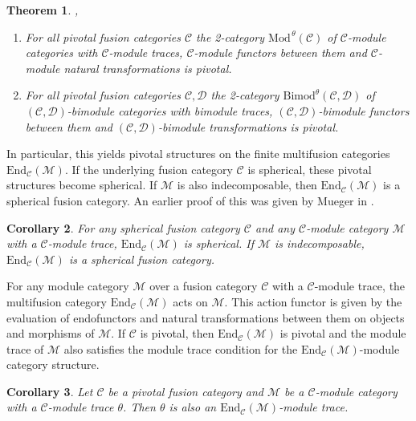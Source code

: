\documentclass[1.5pt, a4paper]{article}
\newcommand{\mac}{\mathcal C}
\newcommand{\mad}{\mathcal D}
\newcommand{\mam}{\mathcal M}
\newcommand{\End}{\mathrm{End}}
\newcommand{\Bimod}{\mathrm{Bimod}}
\newtheorem{theorem}{Theorem}[section]
\newtheorem{corollary}[theorem]{Corollary}
\begin{document}
\begin{theorem}\label{th:pivot}\cite[Th.~4.5]{G12}, \cite[Th.~5.8]{G14} 
\begin{enumerate}
\item For all pivotal fusion categories $\mac$ the 2-category $\text{Mod}^{\,\theta}(\mac)$ of $\mac$-module categories with $\mac$-module traces, $\mac$-module functors between them  and $\mac$-module natural transformations is pivotal.

\item For all  pivotal fusion categories $\mac,\mad$ the 2-category  $\Bimod^\theta(\mac,\mad)$ of  $(\mac,\mad)$-bimodule categories with bimodule traces, $(\mac,\mad)$-bimodule functors between them and $(\mac,\mad)$-bimodule transformations is pivotal. 
\end{enumerate}
\end{theorem}

In particular, this yields  pivotal structures  on the finite multifusion  categories  $\End_\mac(\mam)$. If the underlying fusion category $\mac$ is spherical, these pivotal structures become spherical.  If $\mam$ is also indecomposable, then  $\End_\mac(\mam)$ is a spherical fusion category. An earlier proof of this was given by Mueger in \cite[Th.~5.16]{Mue}.

\begin{corollary} \label{cor:endmpiv} \cite[Prop.~5.10]{G12}  For any spherical fusion category $\mac$ and any  $\mac$-module category $\mam$ with a $\mac$-module trace,
$\End_\mac(\mam)$ is  spherical. If $\mam$ is indecomposable, $\End_\mac(\mam)$ is a spherical fusion category.
\end{corollary}



For any module category $\mam$ over a fusion category $\mac$ with a $\mac$-module trace, the multifusion category $\End_\mac(\mam)$ acts on $\mam$. This  action functor is given by the evaluation of endofunctors  and natural transformations between them on objects and morphisms of $\mam$. If $\mac$ is pivotal, then $\End_\mac(\mam)$ is pivotal and the module trace of $\mam$ also satisfies the module trace condition for the $\End_\mac(\mam)$-module category structure. 


\begin{corollary}\label{lem:macmodule}\cite[Cor.~4.6]{G12} Let $\mac$ be a pivotal fusion category and  $\mam$ be a $\mac$-module category with a $\mac$-module trace $\theta$. Then $\theta$ is also an $\End_\mac(\mam)$-module trace.  
\end{corollary}
\end{document}
